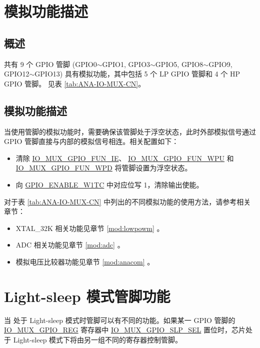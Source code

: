 \documentclass[main\_\_CN.tex]{subfiles}
\begin{document}
\section{模拟功能描述}

\subsection{概述}
\chipname{} 共有 9 个 GPIO 管脚 (GPIO0$\sim$GPIO1, GPIO3$\sim$GPIO5, GPIO8$\sim$GPIO9, GPIO12$\sim$GPIO13) 具有模拟功能，其中包括 5 个 LP GPIO 管脚和 4 个 HP GPIO 管脚。
见表 \ref{tab:ANA-IO-MUX-CN}。

\subsection{模拟功能描述}
当使用管脚的模拟功能时，需要确保该管脚处于浮空状态，此时外部模拟信号通过 GPIO 管脚直接与内部的模拟信号相连。相关配置如下：

\begin{itemize}
    \item 清除 \hyperref[fielddesc:IOMUXGPIONFUNIE]{IO\_MUX\_GPIO\_FUN\_IE}、 \hyperref[fielddesc:IOMUXGPIONFUNWPU]{IO\_MUX\_GPIO\_FUN\_WPU} 和 \hyperref[fielddesc:IOMUXGPIONFUNWPD]{IO\_MUX\_GPIO\_FUN\_WPD} 将管脚设置为浮空状态。
    \item 向 \hyperref[regdesc:GPIOENABLEW1TCREG]{GPIO\_ENABLE\_W1TC} 中对应位写 1，清除输出使能。
\end{itemize}

对于表 \ref{tab:ANA-IO-MUX-CN} 中列出的不同模拟功能的使用方法，请参考相关章节：

\begin{itemize}
    \item XTAL\_32K 相关功能见章节 \ref{mod:lowpowm} \textit{}。
    \item ADC 相关功能见章节 \ref{mod:adc} \textit{}。
    \item 模拟电压比较器功能见章节 \ref{mod:anacom} \textit{}。
\end{itemize}


\section{Light-sleep 模式管脚功能}\label{sec:iomuxgpio-pin-func-light-sleep}

当 \chipname{} 处于 Light-sleep 模式时管脚可以有不同的功能。如果某一 GPIO 管脚的 \hyperref[regdesc:IOMUXGPIONREG]{IO\_MUX\_GPIO\_REG} 寄存器中 \hyperref[fielddesc:IOMUXGPIONSLPSEL]{IO\_MUX\_GPIO\_SLP\_SEL} 置位时，芯片处于 Light-sleep 模式下将由另一组不同的寄存器控制管脚。
\end{document}
